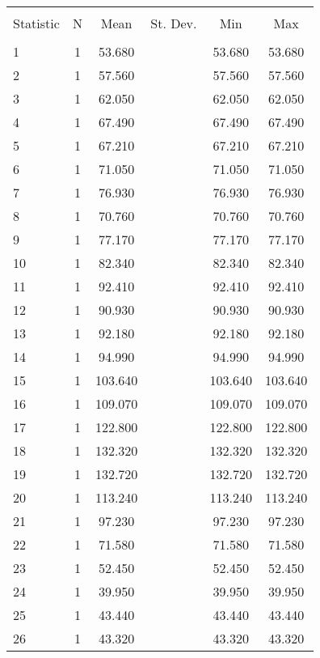 \begin{table}[!htbp] \centering 
  \caption{} 
  \label{} 
\begin{tabular}{@{\extracolsep{5pt}}lccccc} 
\\[-1.8ex]\hline 
\hline \\[-1.8ex] 
Statistic & \multicolumn{1}{c}{N} & \multicolumn{1}{c}{Mean} & \multicolumn{1}{c}{St. Dev.} & \multicolumn{1}{c}{Min} & \multicolumn{1}{c}{Max} \\ 
\hline \\[-1.8ex] 
1 & 1 & 53.680 &  & 53.680 & 53.680 \\ 
2 & 1 & 57.560 &  & 57.560 & 57.560 \\ 
3 & 1 & 62.050 &  & 62.050 & 62.050 \\ 
4 & 1 & 67.490 &  & 67.490 & 67.490 \\ 
5 & 1 & 67.210 &  & 67.210 & 67.210 \\ 
6 & 1 & 71.050 &  & 71.050 & 71.050 \\ 
7 & 1 & 76.930 &  & 76.930 & 76.930 \\ 
8 & 1 & 70.760 &  & 70.760 & 70.760 \\ 
9 & 1 & 77.170 &  & 77.170 & 77.170 \\ 
10 & 1 & 82.340 &  & 82.340 & 82.340 \\ 
11 & 1 & 92.410 &  & 92.410 & 92.410 \\ 
12 & 1 & 90.930 &  & 90.930 & 90.930 \\ 
13 & 1 & 92.180 &  & 92.180 & 92.180 \\ 
14 & 1 & 94.990 &  & 94.990 & 94.990 \\ 
15 & 1 & 103.640 &  & 103.640 & 103.640 \\ 
16 & 1 & 109.070 &  & 109.070 & 109.070 \\ 
17 & 1 & 122.800 &  & 122.800 & 122.800 \\ 
18 & 1 & 132.320 &  & 132.320 & 132.320 \\ 
19 & 1 & 132.720 &  & 132.720 & 132.720 \\ 
20 & 1 & 113.240 &  & 113.240 & 113.240 \\ 
21 & 1 & 97.230 &  & 97.230 & 97.230 \\ 
22 & 1 & 71.580 &  & 71.580 & 71.580 \\ 
23 & 1 & 52.450 &  & 52.450 & 52.450 \\ 
24 & 1 & 39.950 &  & 39.950 & 39.950 \\ 
25 & 1 & 43.440 &  & 43.440 & 43.440 \\ 
26 & 1 & 43.320 &  & 43.320 & 43.320 \\ 

\end{tabular}
\end{table}
